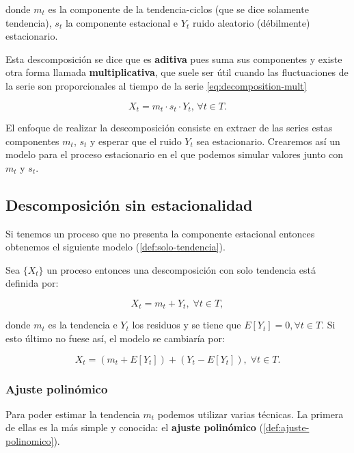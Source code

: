 donde $m_t$ es la componente de la tendencia-ciclos (que se dice solamente tendencia), $s_t$ la componente estacional e $Y_t$ ruido aleatorio (débilmente) estacionario.

Esta descomposición se dice que es \textbf{aditiva} pues suma sus componentes y existe otra forma llamada \textbf{multiplicativa}, que suele ser útil cuando las fluctuaciones de la serie son proporcionales al tiempo de la serie \eqref{eq:decomposition-mult}

\begin{equation}
  X_t = m_t \cdot s_t \cdot Y_t, \, \forall t \in T.
  \label{eq:decomposition-mult}
\end{equation}

El enfoque de realizar la descomposición consiste en extraer de las series estas componentes $m_t$, $s_t$ y esperar que el ruido $Y_t$ sea estacionario. Crearemos así un modelo para el proceso estacionario en el que podemos simular valores junto con $m_t$ y $s_t$.

\subsection{Descomposición sin estacionalidad}

Si tenemos un proceso que no presenta la componente estacional entonces obtenemos el siguiente modelo (\autoref{def:solo-tendencia}).

\begin{definicion}
  Sea $\{X_t\}$ un proceso entonces una descomposición con solo tendencia está definida por:

  $$ X_t = m_t + Y_t, \; \forall t \in T,$$

  donde $m_t$ es la tendencia e $Y_t$ los residuos y se tiene que $E[Y_t] = 0, \forall t \in T$. Si esto último no fuese así, el modelo se cambiaría por:

  $$ X_t = (m_t + E[Y_t]) + (Y_t - E[Y_t]), \; \forall t \in T.$$
  \label{def:solo-tendencia}
\end{definicion}

\subsubsection{Ajuste polinómico}

Para poder estimar la tendencia $m_t$ podemos utilizar varias técnicas. La primera de ellas es la más simple y conocida: el \textbf{ajuste polinómico} (\autoref{def:ajuste-polinomico}).

